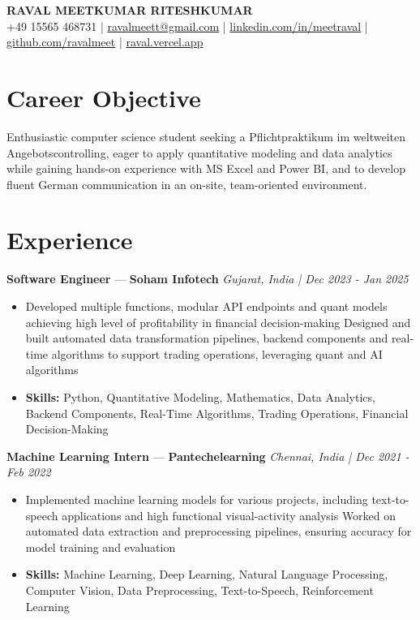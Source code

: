 \documentclass[a4paper,10pt]{article}
\begin{document}
\begin{center}
  {\Large\bfseries RAVAL MEETKUMAR RITESHKUMAR}\\[2pt]
  {\small +49 15565 468731 \;|\; \href{mailto:ravalmeett@gmail.com}{ravalmeett@gmail.com} \;|\; \href{https://www.linkedin.com/in/meetraval/}{linkedin.com/in/meetraval} \;|\; \href{https://github.com/ravalmeet}{github.com/ravalmeet} \;|\; \href{https://raval.vercel.app/}{raval.vercel.app}}
\end{center}
\vspace{-3pt}

\section*{Career Objective}
Enthusiastic computer science student seeking a Pflichtpraktikum im weltweiten Angebotscontrolling, eager to apply quantitative modeling and data analytics while gaining hands-on experience with MS Excel and Power BI, and to develop fluent German communication in an on-site, team-oriented environment.\par

\section*{Experience}
\textbf{Software Engineer} — \textbf{Soham Infotech} \hfill \textit{Gujarat, India \;|\; Dec 2023 - Jan 2025}\par
\vspace{1pt}
\begin{itemize}
  \item Developed multiple functions, modular API endpoints and quant models achieving high level of profitability in financial decision-making Designed and built automated data transformation pipelines, backend components and real-time algorithms to support trading operations, leveraging quant and AI algorithms
  \item \textbf{Skills:} Python, Quantitative Modeling, Mathematics, Data Analytics, Backend Components, Real-Time Algorithms, Trading Operations, Financial Decision-Making
\end{itemize}
\vspace{3pt}
\textbf{Machine Learning Intern} — \textbf{Pantechelearning} \hfill \textit{Chennai, India \;|\; Dec 2021 - Feb 2022}\par
\vspace{1pt}
\begin{itemize}
  \item Implemented machine learning models for various projects, including text-to-speech applications and high functional visual-activity analysis Worked on automated data extraction and preprocessing pipelines, ensuring accuracy for model training and evaluation
  \item \textbf{Skills:} Machine Learning, Deep Learning, Natural Language Processing, Computer Vision, Data Preprocessing, Text-to-Speech, Reinforcement Learning
\end{itemize}
\end{document}
